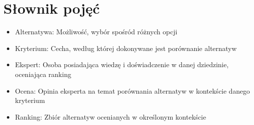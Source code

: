 \documentclass{article}
\begin{document}
\section{Słownik pojęć}

\begin{itemize}
  \item Alternatywa: Możliwość, wybór spośród różnych opcji

  \item Kryterium: Cecha, według której dokonywane jest porównanie alternatyw

  \item Ekspert: Osoba posiadająca wiedzę i doświadczenie w danej dziedzinie,
oceniająca ranking

  \item Ocena: Opinia eksperta na temat porównania alternatyw w kontekście
danego kryterium

  \item Ranking: Zbiór alternatyw ocenianych w określonym kontekście
\end{itemize}
\end{document}
